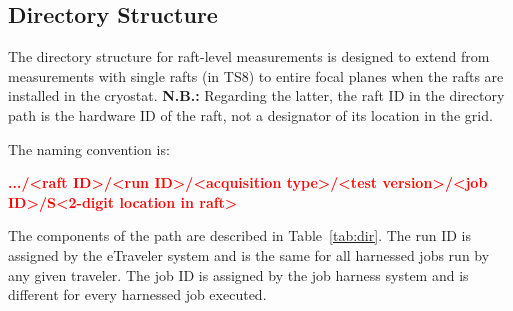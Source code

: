 \documentclass{article}[12pt]
\newcommand{\red}{\textcolor{red}}
\begin{document}
\subsection{Directory Structure}

The directory structure for raft-level measurements is designed to extend from measurements with single rafts (in TS8) to entire focal planes when the rafts are installed in the cryostat.  {\bf N.B.:} Regarding the latter, the raft ID in the directory path is the hardware ID of the raft, not a designator of its location in the grid. 

The naming convention is:


\red{{\bf .../<raft ID>/<run ID>/<acquisition type>/<test version>/<job ID>/S<2-digit location in raft>}}

The components of the path are described in Table~\ref{tab:dir}.  The run ID is assigned by the eTraveler system and is the same for all harnessed jobs run by any given traveler.  The job ID is assigned by the job harness system and is different for every harnessed job executed.  


\end{document}
